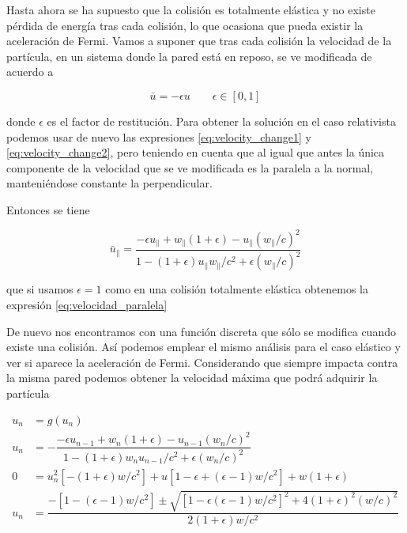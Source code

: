 Hasta ahora se ha supuesto que la colisión es totalmente elástica y no existe pérdida de energía tras cada colisión, lo que ocasiona que pueda existir la aceleración de Fermi. Vamos a suponer que tras cada colisión la velocidad de la partícula, en un sistema donde la pared está en reposo, se ve modificada de acuerdo a 

\begin{equation}
    \bar{u} = -\epsilon u \qquad \epsilon \in \left[ 0, 1 \right]
\end{equation}

donde \( \epsilon \) es el factor de restitución. Para obtener la solución en el caso relativista podemos usar de nuevo las expresiones \ref{eq:velocity_change1} y \ref{eq:velocity_change2}, pero teniendo en cuenta que al igual que antes la única componente de la velocidad que se ve modificada es la paralela a la normal, manteniéndose constante la perpendicular. 

\vspace{3mm}

Entonces se tiene

\begin{equation}
    \bar{u}_\parallel = \dfrac{-\epsilon u_\parallel + w_\parallel (1 + \epsilon) -  u_\parallel (w_\parallel/c)^2}{1 - (1 + \epsilon)u_\parallel w_\parallel/c^2 + \epsilon (w_\parallel/c)^2}
\end{equation}

que si usamos \( \epsilon = 1 \) como en una colisión totalmente elástica obtenemos la expresión \ref{eq:velocidad_paralela}

\vspace{3mm}

De nuevo nos encontramos con una función discreta que sólo se modifica cuando existe una colisión. Así podemos emplear el mismo análisis para el caso elástico y ver si aparece la aceleración de Fermi. Considerando que siempre impacta contra la misma pared podemos obtener la velocidad máxima que podrá adquirir la partícula

\begin{align}\label{eq:Solucion_cobweb_inelastica}
    u_n &= g(u_n) \nonumber\\
    u_n &= -\dfrac{-\epsilon u_{n-1} + w_n(1+\epsilon) -  u_{n-1}(w_n/c)^2}{1 - (1+\epsilon)w_n u_{n-1}/c^2 + \epsilon(w_n/c)^2} \\
    0 &= u_n^2\left[ -(1+\epsilon)w/c^2 \right] + u\left[ 1 - \epsilon + (\epsilon - 1)w/c^2 \right] + w(1+\epsilon) \nonumber\\
    u_n &= \dfrac{-\left[ 1 -  (\epsilon - 1)w/c^2 \right] \pm \sqrt{\left[ 1 - \epsilon (\epsilon - 1)w/c^2 \right]^2 + 4(1+\epsilon)^2(w/c)^2}}{2(1+\epsilon)w/c^2} \label{eq:Solucion_cobweb_inelastica_valor}
\end{align}


